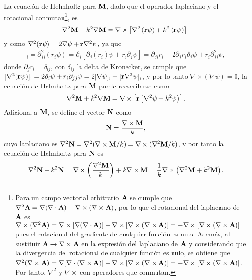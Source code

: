   La  ecuación de Helmholtz para $\vb{M}$, dado que el operador laplaciano y el rotacional conmutan\footnote{ Para un campo vectorial arbitrario $\vb{A}$ se cumple que $\nabla^2\vb{A} = \nabla(\nabla\cdot\vb{A}) - \nabla\times(\nabla\times\vb{A})$, por lo que el rotacional del laplaciano de $\vb{A}$ es $ \nabla\times( \nabla^2\vb{A})=\nabla\times[\nabla(\nabla\cdot\vb{A})  ]-  \nabla\times[\nabla\times(\nabla\times \vb{A})] = -  \nabla\times[\nabla\times(\nabla\times \vb{A})] $ pues el rotacional del gradiente de cualquier función es nulo. Además, al sustituir $\vb{A}\to \nabla\times\vb{A}$ en la expresión del laplaciano de $\vb{A}$ y  considerando que la divergencia del rotacional de cualquier función es nulo, se obtiene que$ \nabla^2(\nabla\times\vb{A})=\nabla[\nabla\cdot(\nabla\times\vb{A})  ]-  \nabla\times[\nabla\times(\nabla\times \vb{A})] = -  \nabla\times[\nabla\times(\nabla\times \vb{A})] $. Por tanto, $\nabla^2$ y $\nabla\times$ con operadores que conmutan.}, es
	\begin{align}
	\nabla^2 \vb{M} + k^2 \nabla\vb{M} = \nabla\times \left[ \nabla^2\left(\vb{r} \psi\right)  
											+ k^2  \left(\vb{r} \psi\right) \right],
	\end{align}
y como   $\nabla^2 (\vb{r}\psi)=2\nabla\psi+\vb{r}\nabla^2\psi$, ya que
	\begin{align}
[\nabla^2 (\vb{r}\psi)]_i = \partial^2_{jj}(r_i\psi)= \partial_j [\partial_j(r_i)\psi+r_i\partial_j\psi] =\partial_{jj}{r_i} + 2 \partial_jr_i\partial_j\psi+r_i\partial^2_{jj}\psi,
	\end{align}
 donde $\partial_j r_i = \delta_{ij}$, con $\delta_{ij}$ la delta de Kronecker,  se cumple que $[\nabla^2 (\vb{r}\psi)]_i = 2\partial_i\psi+r_i\partial_{jj}\psi = 2[\nabla\psi]_i + [\vb{r}\nabla^2\psi]_i$, y por lo tanto $\nabla\times(\nabla \psi)=0$, la ecuación de Helmholtz para $\vb{M}$ puede reescribirse como
	\begin{align}
	\nabla^2 \vb{M} + k^2 \nabla\vb{M}  = \nabla\times\left[\vb{r}\left( \nabla^2\psi+k^2\psi \right) \right].
	\end{align}
Adicional a $\vb{M}$, se define el vector $\vb{N}$ como \cite{bohren1998absorption} 
	\begin{align}
	\vb{N} = \frac{\nabla\times \vb{M}}{k}, \label{eq:NrotM/k}
	\end{align}
cuyo laplaciano es $\nabla^2 \vb{N} = \nabla^2( \nabla\times \vb{M} /k) =  \nabla\times (\nabla^2\vb{M} /k) $, y por tanto la ecuación de Helmholtz para $\vb{N}$ es
	\begin{align*}
	\nabla^2 \vb{N} + k^2 \vb{N} =  \nabla\times \left( \frac{\nabla^2 \vb{M}}{k} \right) + k \nabla\times \vb{M} 
		 = \frac{1}{k} \nabla\times \left( \nabla^2 \vb{M} + k^2  \vb{M} \right).
	\end{align*}\vspace*{-1em}
	
